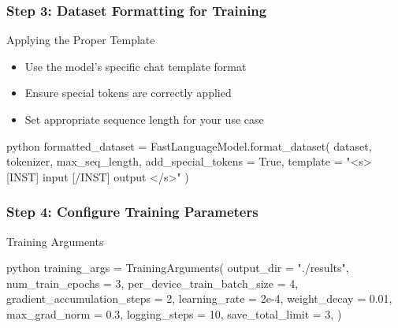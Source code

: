 \documentclass[aspectratio=169]{beamer}
\begin{document}
\begin{frame}[fragile]
	\frametitle{Step 3: Dataset Formatting for Training}
	\begin{block}{Applying the Proper Template}
		\begin{itemize}
			\item Use the model's specific chat template format
			\item Ensure special tokens are correctly applied
			\item Set appropriate sequence length for your use case
		\end{itemize}
	\end{block}
	\begin{mintedbox}{python}
formatted_dataset = FastLanguageModel.format_dataset(
    dataset,
    tokenizer,
    max_seq_length,
    add_special_tokens = True,
    template = "<s>[INST] {input} [/INST] {output} </s>"
)
	\end{mintedbox}
\end{frame}

\begin{frame}[fragile]
	\frametitle{Step 4: Configure Training Parameters}
	\begin{block}{Training Arguments}
	\begin{mintedbox}{python}
training_args = TrainingArguments(
    output_dir = "./results",
    num_train_epochs = 3,
    per_device_train_batch_size = 4,
    gradient_accumulation_steps = 2,
    learning_rate = 2e-4,
    weight_decay = 0.01,
    max_grad_norm = 0.3,
    logging_steps = 10,
    save_total_limit = 3,
)
	\end{mintedbox}
	\end{block}
\end{frame}
\end{document}
